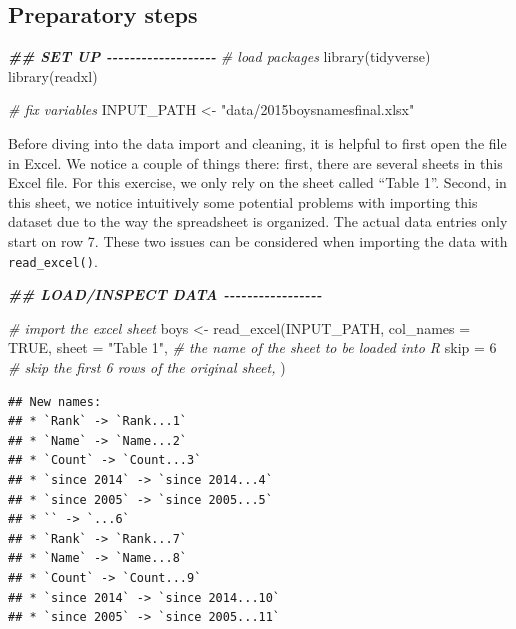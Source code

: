\documentclass[
  12pt,
]{style/krantz}
\newenvironment{Shaded}{\begin{snugshade}}{\end{snugshade}}
\newcommand{\AttributeTok}[1]{\textcolor[rgb]{0.77,0.63,0.00}{#1}}
\newcommand{\CommentTok}[1]{\textcolor[rgb]{0.56,0.35,0.01}{\textit{#1}}}
\newcommand{\ConstantTok}[1]{\textcolor[rgb]{0.00,0.00,0.00}{#1}}
\newcommand{\DecValTok}[1]{\textcolor[rgb]{0.00,0.00,0.81}{#1}}
\newcommand{\DocumentationTok}[1]{\textcolor[rgb]{0.56,0.35,0.01}{\textbf{\textit{#1}}}}
\newcommand{\FunctionTok}[1]{\textcolor[rgb]{0.00,0.00,0.00}{#1}}
\newcommand{\NormalTok}[1]{#1}
\newcommand{\OtherTok}[1]{\textcolor[rgb]{0.56,0.35,0.01}{#1}}
\newcommand{\StringTok}[1]{\textcolor[rgb]{0.31,0.60,0.02}{#1}}
\begin{document}
\hypertarget{preparatory-steps}{%
\subsection{Preparatory steps}\label{preparatory-steps}}

\begin{Shaded}
\begin{Highlighting}[]
\DocumentationTok{\#\# SET UP {-}{-}{-}{-}{-}{-}{-}{-}{-}{-}{-}{-}{-}{-}{-}{-}{-}{-}{-}}
\CommentTok{\# load packages}
\FunctionTok{library}\NormalTok{(tidyverse)}
\FunctionTok{library}\NormalTok{(readxl)}

\CommentTok{\# fix variables}
\NormalTok{INPUT\_PATH }\OtherTok{\textless{}{-}} \StringTok{"data/2015boysnamesfinal.xlsx"}
\end{Highlighting}
\end{Shaded}

Before diving into the data import and cleaning, it is helpful to first open the file in Excel. We notice a couple of things there: first, there are several sheets in this Excel file. For this exercise, we only rely on the sheet called ``Table 1''. Second, in this sheet, we notice intuitively some potential problems with importing this dataset due to the way the spreadsheet is organized. The actual data entries only start on row 7. These two issues can be considered when importing the data with \texttt{read\_excel()}.

\begin{Shaded}
\begin{Highlighting}[]
\DocumentationTok{\#\# LOAD/INSPECT DATA {-}{-}{-}{-}{-}{-}{-}{-}{-}{-}{-}{-}{-}{-}{-}{-}{-}}

\CommentTok{\# import the excel sheet}
\NormalTok{boys }\OtherTok{\textless{}{-}} \FunctionTok{read\_excel}\NormalTok{(INPUT\_PATH, }\AttributeTok{col\_names =} \ConstantTok{TRUE}\NormalTok{,}
                   \AttributeTok{sheet =} \StringTok{"Table 1"}\NormalTok{, }\CommentTok{\# the name of the sheet to be loaded into R}
                   \AttributeTok{skip =} \DecValTok{6} \CommentTok{\# skip the first 6 rows of the original sheet,}
\NormalTok{                   )}
\end{Highlighting}
\end{Shaded}

\begin{verbatim}
## New names:
## * `Rank` -> `Rank...1`
## * `Name` -> `Name...2`
## * `Count` -> `Count...3`
## * `since 2014` -> `since 2014...4`
## * `since 2005` -> `since 2005...5`
## * `` -> `...6`
## * `Rank` -> `Rank...7`
## * `Name` -> `Name...8`
## * `Count` -> `Count...9`
## * `since 2014` -> `since 2014...10`
## * `since 2005` -> `since 2005...11`
\end{verbatim}
\end{document}

